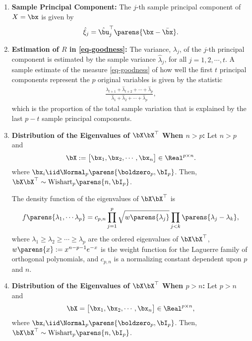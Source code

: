 \documentclass[12pt]{article}
\begin{document}
\begin{enumerate}[label=\textbf{\arabic*.}]
	\item \textbf{Sample Principal Component:} The $j$-th sample principal component of $X = \bx$ is given by 
	\begin{align*}
		\hat{\xi}_j = \hat{\bu}_j^\top \parens{\bx - \bar{\bx}}. 
	\end{align*}
	
	\item \textbf{Estimation of $R$ in \eqref{eq-goodness}:} The variance, $\lambda_j$, of the $j$-th principal component is estimated by the sample variance $\hat{\lambda}_j$, for all $j = 1, 2, \cdots, t$. A sample estimate of the measure \eqref{eq-goodness} of how well the first $t$ principal components represent the $p$ original variables is given by the statistic 
	\begin{align*}
		\frac{\hat{\lambda}_{t+1} + \hat{\lambda}_{t+2} + \cdots + \hat{\lambda}_{p}}{\hat{\lambda}_{1} + \hat{\lambda}_{2} + \cdots + \hat{\lambda}_{p}}, 
	\end{align*}
	which is the proportion of the total sample variation that is explained by the last $p - t$ sample principal components. 

	\item \textbf{Distribution of the Eigenvalues of $\bX \bX^\top$ When $n > p$:} Let $n > p$ and 
	\begin{align*}
		\bX := \begin{bmatrix}
			\bx_1, \bx_2, \cdots, \bx_n
		\end{bmatrix} \in \Real^{p \times n}. 
	\end{align*}
	where $\bx_i \iid \Normal_p \parens{\boldzero_p, \bI_p}$. Then, $\bX \bX^\top \sim \mathrm{Wishart}_p \parens{n, \bI_p}$. 
	
	The density function of the eigenvalues of $\bX \bX^\top$ is 
	\begin{align*}
		f \parens{\lambda_1, \cdots \lambda_p} = c_{p, n} \prod_{j=1}^p \sqrt{w \parens{\lambda_j}} \prod_{j < k} \parens{\lambda_j - \lambda_k}, 
	\end{align*}
	where $\lambda_1 \ge \lambda_2 \ge \cdots \ge \lambda_p$ are the ordered eigenvalues of $\bX \bX^\top$, $w \parens{x} := x^{n-p-1} e^{-x}$ is the weight function for the Laguerre family of orthogonal polynomials, and $c_{p,n}$ is a normalizing constant dependent upon $p$ and $n$. 
	
	\item \textbf{Distribution of the Eigenvalues of $\bX \bX^\top$ When $p > n$:} Let $p > n$ and 
	\begin{align*}
		\bX = \begin{bmatrix}
			\bx_1, \bx_2, \cdots, \bx_n
		\end{bmatrix} \in \Real^{p \times n}, 
	\end{align*}
	where $\bx_i \iid \Normal_p \parens{\boldzero_p, \bI_p}$. Then, $\bX \bX^\top \sim \mathrm{Wishart}_p \parens{n, \bI_p}$. 
	

\end{enumerate}
\end{document}
